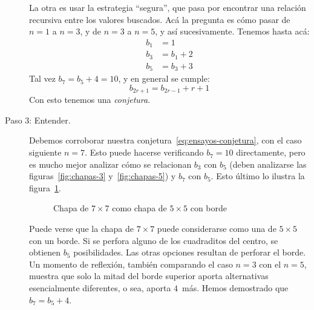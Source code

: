 \begin{solution}
\begin{description}
      La otra es usar la estrategia ``segura'',
      que pasa por encontrar una relación recursiva
      entre los valores buscados.
      Acá la pregunta es cómo pasar de \(n = 1\) a \(n = 3\),
      y de \(n = 3\) a \(n = 5\),
      y así sucesivamente.
      Tenemos hasta acá:
      \begin{align}
	b_1
	  &= 1
	  \label{eq:ensayos-1} \\
	b_3
	  &= b_1 + 2
	  \label{eq:ensayos-3} \\
	b_5
	  &= b_3 + 3
	  \label{eq:ensayos-5}
      \end{align}
      Tal vez \(b_7 = b_5 + 4 = 10\),
      y en general se cumple:
      \begin{equation}
	\label{eq:ensayos-conjetura}
	b_{2 r + 1} = b_{2 r - 1} + r + 1
      \end{equation}
      Con esto tenemos una \emph{conjetura}.
    \item[Paso 3: Entender.]
      Debemos corroborar
      nuestra conjetura~\eqref{eq:ensayos-conjetura},
      con el caso siguiente \(n = 7\).
      Esto puede hacerse verificando \(b_7 = 10\) directamente,
      pero es mucho mejor analizar cómo se relacionan
      \(b_3\) con \(b_5\)
      (deben analizarse
       las figuras~\ref{fig:chapas-3} y~\ref{fig:chapas-5})
      y \(b_7\) con \(b_5\).
      Esto último lo ilustra la figura~\ref{fig:badge-7}.
      \begin{figure}[htbp]
	\centering
	\caption{Chapa de $7 \times 7$
		 como chapa de $5 \times 5$ con borde}
	\label{fig:badge-7}
      \end{figure}
      Puede verse que la chapa de \(7 \times 7\) puede considerarse
      como una de \(5 \times 5\) con un borde.
      Si se perfora alguno de los cuadraditos del centro,
      se obtienen \(b_5\) posibilidades.
      Las otras opciones resultan de perforar el borde.
      Un momento de reflexión,
      también comparando el caso \(n = 3\) con el \(n = 5\),
      muestra que solo la mitad del borde superior
      aporta alternativas esencialmente diferentes,
      o sea,
      aporta \(4\)~más.
      Hemos demostrado que \(b_7 = b_5 + 4\).


\end{description}
\end{solution}
